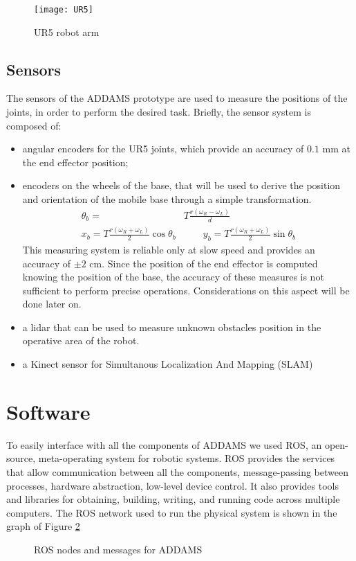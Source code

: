 \begin{figure}[htbp]
\begin{center} 
	\texttt{[image: UR5]}
	\centering
	\label{fig:UR5}
	\caption{UR5 robot arm} 
\end{center}
\end{figure}


\subsection{Sensors}

The sensors of the ADDAMS prototype are used to measure the positions of the joints, in order to perform the desired task. Briefly, the sensor system is composed of:
\begin{itemize}
\item angular encoders for the UR5 joints, which provide an accuracy of $0.1$ mm at the end effector position;
\item encoders on the wheels of the base, that will be used to derive the position and orientation of the mobile base through a simple transformation.
\begin{equation*}
\begin{split}
\theta_b=&T\frac{r(\omega_R-\omega_L)}{d} \\ x_b=T\frac{r(\omega_R+\omega_L)}{2}\cos\theta_b &\qquad y_b=T\frac{r(\omega_R+\omega_L)}{2}\sin\theta_b
\end{split}
\end{equation*}
This measuring system is reliable only at slow speed and provides an accuracy of $\pm 2$ cm. Since the position of the end effector is computed knowing the position of the base, the accuracy of these measures is not sufficient to perform precise operations. Considerations on this aspect will be done later on.
\item a lidar that can be used to measure unknown obstacles position in the operative area of the robot.
\item a Kinect sensor for Simultanous Localization And Mapping (SLAM)
\end{itemize}

\section{Software}

To easily interface with all the components of ADDAMS we used ROS, an open-source, meta-operating system for robotic systems. ROS provides the services that allow communication between all the components, message-passing between processes, hardware abstraction, low-level device control. It also provides tools and libraries for obtaining, building, writing, and running code across multiple computers. The ROS network used to run the physical system is shown in the graph of Figure \ref{ROSnodes}
\begin{figure}[h!]

\centering

\caption{ROS nodes and messages for ADDAMS}
\label{ROSnodes} 
\end{figure}

